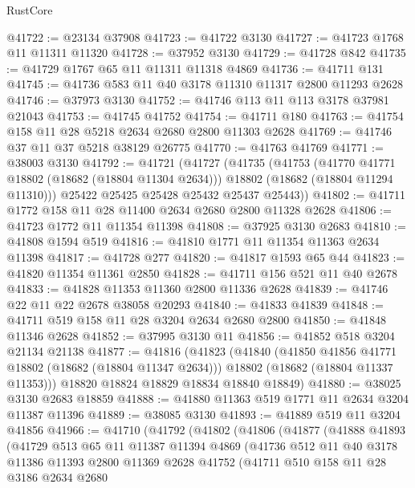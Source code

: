 \begin{lexlean}{RustCore}
\begin{coremodule}
@41722 := @23134 @37908
@41723 := @41722 @3130
@41727 := @41723 @1768 @11 @11311 @11320
@41728 := @37952 @3130
@41729 := @41728 @842
@41735 := @41729 @1767 @65 @11 @11311 @11318 @4869
@41736 := @41711 @131
@41745 := @41736 @583 @11 @40 @3178 @11310 @11317 @2800 @11293 @2628
@41746 := @37973 @3130
@41752 := @41746 @113 @11 @113 @3178 @37981 @21043
@41753 := @41745 @41752
@41754 := @41711 @180
@41763 := @41754 @158 @11 @28 @5218 @2634 @2680 @2800 @11303 @2628
@41769 := @41746 @37 @11 @37 @5218 @38129 @26775
@41770 := @41763 @41769
@41771 := @38003 @3130
@41792 := @41721
    (@41727
      (@41735
        (@41753
          (@41770 @41771 @18802 (@18682 (@18804 @11304 @2634)))
          @18802
          (@18682 (@18804 @11294 @11310)))
        @25422
        @25425
        @25428
        @25432
        @25437
        @25443))
@41802 := @41711 @1772 @158 @11 @28 @11400 @2634 @2680 @2800 @11328 @2628
@41806 := @41723 @1772 @11 @11354 @11398
@41808 := @37925 @3130 @2683
@41810 := @41808 @1594 @519
@41816 := @41810 @1771 @11 @11354 @11363 @2634 @11398
@41817 := @41728 @277
@41820 := @41817 @1593 @65 @44
@41823 := @41820 @11354 @11361 @2850
@41828 := @41711 @156 @521 @11 @40 @2678
@41833 := @41828 @11353 @11360 @2800 @11336 @2628
@41839 := @41746 @22 @11 @22 @2678 @38058 @20293
@41840 := @41833 @41839
@41848 := @41711 @519 @158 @11 @28 @3204 @2634 @2680 @2800
@41850 := @41848 @11346 @2628
@41852 := @37995 @3130 @11
@41856 := @41852 @518 @3204 @21134 @21138
@41877 := @41816
    (@41823
      (@41840
        (@41850 @41856 @41771 @18802 (@18682 (@18804 @11347 @2634)))
        @18802
        (@18682 (@18804 @11337 @11353)))
      @18820
      @18824
      @18829
      @18834
      @18840
      @18849)
@41880 := @38025 @3130 @2683 @18859
@41888 := @41880 @11363 @519 @1771 @11 @2634 @3204 @11387 @11396
@41889 := @38085 @3130
@41893 := @41889 @519 @11 @3204 @41856
@41966 := @41710
    (@41792
      (@41802
        (@41806
          (@41877
            (@41888
              @41893
              (@41729
                @513
                @65
                @11
                @11387
                @11394
                @4869
                (@41736
                  @512
                  @11
                  @40
                  @3178
                  @11386
                  @11393
                  @2800
                  @11369
                  @2628
                  @41752
                  (@41711
                    @510
                    @158
                    @11
                    @28
                    @3186
                    @2634
                    @2680

\end{coremodule}
\end{lexlean}

